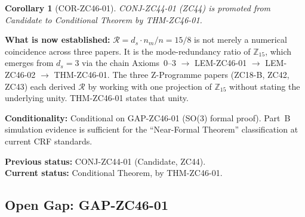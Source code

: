 \documentclass[12pt, a4paper]{article}
\newtheorem{corollary}{Corollary}[section]
\begin{document}
\begin{derivedbox}[title={COR-ZC46-01: CONJ-ZC44-01 Promoted
  Candidate $\to$ Theorem (Conditional)}]

\begin{corollary}[COR-ZC46-01]
\label{cor:zc46-01}
CONJ-ZC44-01 (ZC44) is promoted from Candidate to
\emph{Conditional Theorem} by THM-ZC46-01.
\end{corollary}

\textbf{What is now established:}
$\mathcal{R} = d_s\cdot n_m/n = 15/8$ is not merely a numerical
coincidence across three papers. It is the mode-redundancy ratio
of $\mathbb{Z}_{15}$, which emerges from $d_s = 3$ via the
chain Axioms~0--3 $\to$ LEM-ZC46-01 $\to$ LEM-ZC46-02
$\to$ THM-ZC46-01. The three Z-Programme papers (ZC18-B, ZC42,
ZC43) each derived $\mathcal{R}$ by working with one projection
of $\mathbb{Z}_{15}$ without stating the underlying unity.
THM-ZC46-01 states that unity.

\textbf{Conditionality:} Conditional on GAP-ZC46-01 (SO(3)
formal proof). Part~B simulation evidence is sufficient for the
``Near-Formal Theorem'' classification at current CRF standards.

\textbf{Previous status:} CONJ-ZC44-01 (Candidate, ZC44).\\
\textbf{Current status:} Conditional Theorem, by THM-ZC46-01.
\end{derivedbox}

\subsection{Open Gap: GAP-ZC46-01}

\end{document}

